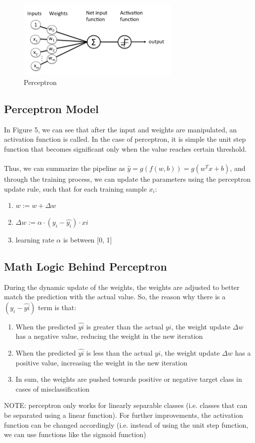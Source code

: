 \documentclass[12pt]{article}
\begin{document}
\begin{figure}[htbp]
\begin{center}
\includegraphics[width = 0.7\textwidth]{Images/Perceptron.png}
\caption{Perceptron}
\label{default}
\end{center}
\end{figure}

\subsection{Perceptron Model}
In Figure 5, we can see that after the input and weights are manipulated, an activation function is called. In the case of perceptron, it is simple the unit step function that becomes significant only when the value reaches certain threshold.\\
\\
Thus, we can summarize the pipeline as $\hat{y} = g(f(w, b)) = g(w^Tx + b)$, and through the training process, we can update the parameters using the perceptron update rule, such that for each training sample $x_i$:
\begin{enumerate}
	\item $w := w + \Delta w$
	\item $\Delta w := \alpha \cdot (y_i - \hat{y_i})\cdot x  i$
	\item learning rate $\alpha$ is between [0, 1]
\end{enumerate}

\subsection{Math Logic Behind Perceptron}
During the dynamic update of the weights, the weights are adjusted to better match the prediction with the actual value. So, the reason why there is a $(y_i - \hat{y  i})$ term is that:
\begin{enumerate}
	\item When the predicted $\hat{y  i}$ is greater than the actual $y  i$, the weight update $\Delta w$ has a negative value, reducing the weight in the new iteration
	\item When the predicted $\hat{y  i}$ is less than the actual $y  i$, the weight update $\Delta w$ has a positive value, increasing the weight in the new iteration
	\item In sum, the weights are pushed towards positive or negative target class in cases of misclassification  
\end{enumerate}
NOTE: perceptron only works for linearly separable classes (i.e. classes that can be separated using a linear function). For further improvements, the activation function can be changed accordingly (i.e. instead of using the unit step function, we can use functions like the sigmoid function)
\newpage
\end{document}
